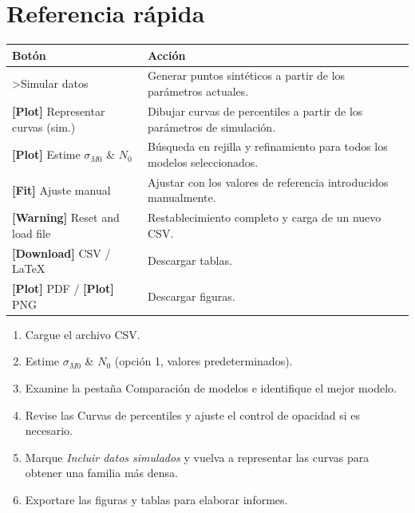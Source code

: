 \documentclass[11pt,a4paper]{article}
\newcommand{\sMzero}{\ensuremath{\sigma_{M0}}}
\newcommand{\Nzero}{\ensuremath{N_0}}
\begin{document}
\section{Referencia rápida}

\begin{center}
\begin{tabularx}{\textwidth}{lX}
\toprule
\textbf{Botón} & \textbf{Acción} \\
\midrule
\textgreater Simular datos & Generar puntos sintéticos a partir de los parámetros actuales. \\
\textbf{[Plot]} Representar curvas (sim.) & Dibujar curvas de percentiles a partir de los parámetros de simulación. \\
\textbf{[Plot]} Estime $\sMzero$ \& $\Nzero$ & Búsqueda en rejilla y refinamiento para todos los modelos seleccionados. \\
\textbf{[Fit]} Ajuste manual & Ajustar con los valores de referencia introducidos manualmente. \\
\textbf{[Warning]} Reset and load file & Restablecimiento completo y carga de un nuevo CSV. \\
\textbf{[Download]} CSV / LaTeX & Descargar tablas. \\
\textbf{[Plot]} PDF / \textbf{[Plot]} PNG & Descargar figuras. \\
\bottomrule
\end{tabularx}
\end{center}

\begin{notebox}
\begin{enumerate}
  \item Cargue el archivo CSV.
  \item Estime $\sMzero$ \& $\Nzero$ (opción 1, valores predeterminados).
  \item Examine la pestaña Comparación de modelos e identifique el mejor modelo.
  \item Revise las Curvas de percentiles y ajuste el control de opacidad si es necesario.
  \item Marque \textit{Incluir datos simulados} y vuelva a representar las curvas para obtener una familia más densa.
  \item Exportare las figuras y tablas para elaborar informes.
\end{enumerate}
\end{notebox}
\end{document}

